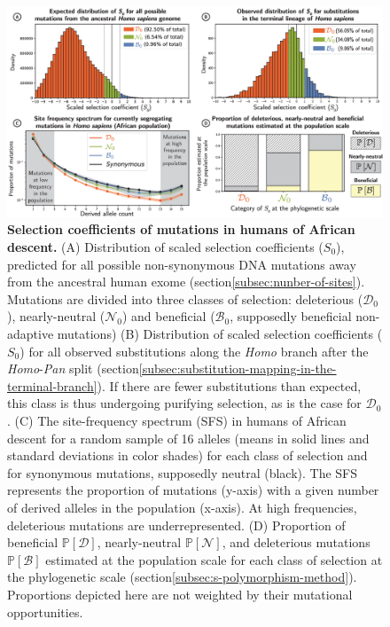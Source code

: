 \documentclass[10pt,letterpaper]{article}
\newcommand{\proba}{\mathbb{P}}
\newcommand{\Sphy}{S_{0}}
\newcommand{\SphyDel}{\mathcal{D}_0}
\newcommand{\SphyNeu}{\mathcal{N}_0}
\newcommand{\SphyBen}{\mathcal{B}_0}
\newcommand{\SpopDel}{\mathcal{D}}
\newcommand{\SpopNeu}{\mathcal{N}}
\newcommand{\SpopBen}{\mathcal{B}}
\newcommand{\ProbaPopDel}{\proba [ \SpopDel]}
\newcommand{\ProbaPopNeu}{\proba [ \SpopNeu ]}
\newcommand{\ProbaPopBen}{\proba [ \SpopBen ]}
\providecommand{\DIFaddtex}[1]{{\protect\color{blue}\uwave{#1}}} %
\providecommand{\DIFaddFL}[1]{\DIFadd{#1}} %
\providecommand{\DIFaddbeginFL}{} %
\providecommand{\DIFaddendFL}{} %
\providecommand{\DIFadd}[1]{\texorpdfstring{\DIFaddtex{#1}}{#1}} %
\newcommand{\DIFaddincludegraphics}[2][]{{\color{blue}\fbox{\DIFOincludegraphics[#1]{#2}}}} %
\DeclareRobustCommand{\DIFaddbeginFL}{\DIFOaddbeginFL \let\includegraphics\DIFaddincludegraphics} %
\DeclareRobustCommand{\DIFaddendFL}{\DIFOaddendFL \let\includegraphics\DIFOincludegraphics} %
\begin{document}
\begin{figure}[!ht]
\begin{adjustwidth}{-2.25in}{0in} %
\centering
\includegraphics[width=1.4\textwidth, page=1] {figure3.eps}
\caption{
{\bf Selection coefficients of mutations in humans of African descent.}
(A) Distribution of scaled selection coefficients ($\Sphy$), predicted for all possible non-synonymous DNA mutations away from the ancestral human exome (section\DIFaddbeginFL \DIFaddFL{~}\DIFaddendFL \ref{subsec:nunber-of-sites}).
Mutations are divided into three classes of selection: deleterious ($\SphyDel$), nearly-neutral ($\SphyNeu$) and beneficial ($\SphyBen$, supposedly beneficial non-adaptive mutations)
(B) Distribution of scaled selection coefficients ($\Sphy$) for all observed substitutions along the \textit{Homo} branch after the \textit{Homo}-\textit{Pan} split (section\DIFaddbeginFL \DIFaddFL{~}\DIFaddendFL \ref{subsec:substitution-mapping-in-the-terminal-branch}).
If there are fewer substitutions than expected, this class is thus undergoing purifying selection, as is the case for $\SphyDel$.
(C) The site-frequency spectrum (SFS) in humans of African descent for a random sample of 16 alleles (means in solid lines and standard deviations in color shades) for each class of selection and for synonymous mutations, supposedly neutral (black). The SFS represents the proportion of mutations (y-axis) with a given number of derived alleles in the population (x-axis).
At high frequencies, deleterious mutations are underrepresented.
(D) Proportion of beneficial $\ProbaPopDel$, nearly-neutral $\ProbaPopNeu$, and deleterious mutations $\ProbaPopBen$ estimated at the population scale for each class of selection at the phylogenetic scale (section\DIFaddbeginFL \DIFaddFL{~}\DIFaddendFL \ref{subsec:s-polymorphism-method}). Proportions depicted here are not weighted by their mutational opportunities.
}
\label{fig:homo-afr-results}
\end{adjustwidth}
\end{figure}
\end{document}
